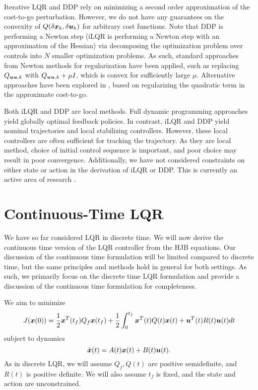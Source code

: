 Iterative LQR and DDP rely on minimizing a second order approximation of the cost-to-go perturbation. However, we do not have any guarantees on the convexity of $Q(\delta \bm{x}_k, \delta \bm{u}_k)$ for arbitrary cost functions. Note that DDP is performing a Newton step \cite{liao1992advantages} (iLQR is performing a Newton step with an approximation of the Hessian) via decomposing the optimization problem over controls into $N$ smaller optimization problems. As such, standard approaches from Newton methods for regularization have been applied, such as replacing $Q_{\bm{u}\bm{u},k}$ with $Q_{\bm{u}\bm{u},k} + \mu I$, which is convex for sufficiently large $\mu$. Alternative approaches have been explored in \cite{tassa2012synthesis,tassa2014control}, based on regularizing the quadratic term in the approximate cost-to-go. 

Both iLQR and DDP are local methods. Full dynamic programming approaches yield globally optimal feedback policies. In contrast, iLQR and DDP yield nominal trajectories and local stabilizing controllers. However, these local controllers are often sufficient for tracking the trajectory. As they are local method, choice of initial control sequence is important, and poor choice may result in poor convergence. Additionally, we have not considered constraints on either state or action in the derivation of iLQR or DDP. This is currently an active area of research \cite{xie2017differential, tassa2014control, giftthaler2017projection}.


\section{Continuous-Time LQR}

We have so far considered LQR in discrete time. We will now derive the continuous time version of the LQR controller from the HJB equations. Our discussion of the continuous time formulation will be limited compared to discrete time, but the same principles and methods hold in general for both settings. As such, we primarily focus on the discrete time LQR formulation and provide a discussion of the continuous time formulation for completeness. 

We aim to minimize 
\begin{equation}
    J(\bm{x}(0)) = \frac{1}{2} \bm{x}^T(t_f) Q_f \bm{x}(t_f) + \frac{1}{2} \int_0^{t_f} \bm{x}^T(t) Q(t) \bm{x}(t) + \bm{u}^T(t) R(t) \bm{u}(t) dt
\end{equation}
subject to dynamics
\begin{equation}
    \dot{\bm{x}}(t) = A(t) \bm{x}(t) + B(t) \bm{u}(t).
\end{equation}
As in discrete LQR, we will assume $Q_f, Q(t)$ are positive semidefinite, and $R(t)$ is positive definite. We will also assume $t_f$ is fixed, and the state and action are unconstrained. 

